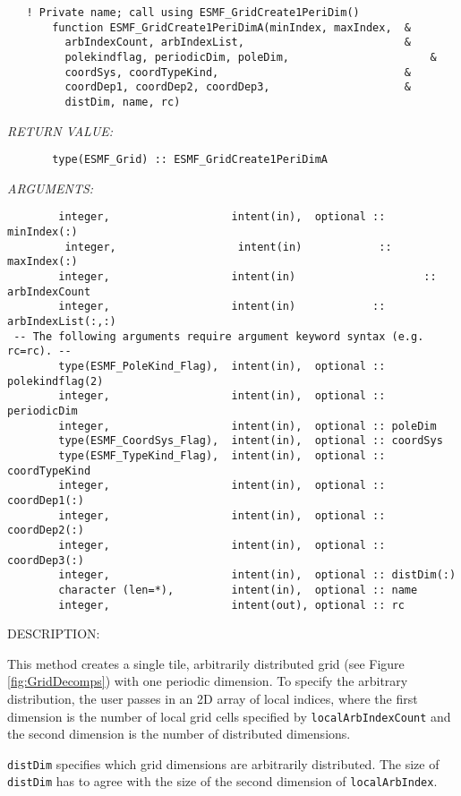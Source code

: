  
\begin{verbatim}   ! Private name; call using ESMF_GridCreate1PeriDim()
       function ESMF_GridCreate1PeriDimA(minIndex, maxIndex,  &
         arbIndexCount, arbIndexList,                         &
         polekindflag, periodicDim, poleDim,                      &
         coordSys, coordTypeKind,                             &
         coordDep1, coordDep2, coordDep3,                     &
         distDim, name, rc)\end{verbatim}{\em RETURN VALUE:}
\begin{verbatim}       type(ESMF_Grid) :: ESMF_GridCreate1PeriDimA\end{verbatim}{\em ARGUMENTS:}
\begin{verbatim}        integer,                   intent(in),  optional :: minIndex(:)
         integer,                   intent(in)            :: maxIndex(:)
        integer,                   intent(in)                    :: arbIndexCount
        integer,                   intent(in)            :: arbIndexList(:,:)
 -- The following arguments require argument keyword syntax (e.g. rc=rc). --
        type(ESMF_PoleKind_Flag),  intent(in),  optional :: polekindflag(2)
        integer,                   intent(in),  optional :: periodicDim
        integer,                   intent(in),  optional :: poleDim
        type(ESMF_CoordSys_Flag),  intent(in),  optional :: coordSys
        type(ESMF_TypeKind_Flag),  intent(in),  optional :: coordTypeKind
        integer,                   intent(in),  optional :: coordDep1(:)
        integer,                   intent(in),  optional :: coordDep2(:)
        integer,                   intent(in),  optional :: coordDep3(:)
        integer,                   intent(in),  optional :: distDim(:)
        character (len=*),         intent(in),  optional :: name
        integer,                   intent(out), optional :: rc\end{verbatim}
{\sf DESCRIPTION:\\ }


  
   This method creates a single tile, arbitrarily distributed grid
   (see Figure \ref{fig:GridDecomps}) with one periodic dimension.
   To specify the arbitrary distribution, the user passes in an 2D array
   of local indices, where the first dimension is the number of local grid cells
   specified by {\tt localArbIndexCount} and the second dimension is the number of distributed
   dimensions.
  
   {\tt distDim} specifies which grid dimensions are arbitrarily distributed. The
   size of {\tt distDim} has to agree with the size of the second dimension of
   {\tt localArbIndex}.
  
